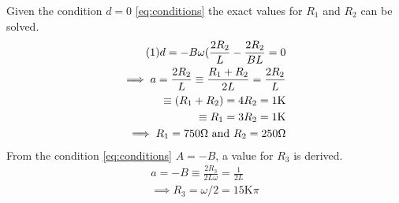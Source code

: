 \documentclass[conference]{IEEEtran}
\newcommand\numberthis{\addtocounter{equation}{1}\tag{\theequation}}
\begin{document}
Given the condition $d=0$ \eqref{eq:conditions} the exact values for $R_1$ and $R_2$ can be solved.
\begin{align*} \numberthis \label{eq:R1,R2}
    d = -B\omega(\frac{2R_2}{L}-\frac{2R_2}{BL} = 0 \\ 
    \implies a = \frac{2R_2}{L} \equiv \frac{R_1 + R_2}{2L} = \frac{2R_2}{L} \\
    \equiv (R_1 + R_2)  = 4R_2 = 1\text{K} \\
    \equiv R_1 = 3R_2 = 1\text{K} \\ 
    \implies R_1 = 750\Omega \text{ and } R_2 = 250\Omega
\end{align*}
From the condition \eqref{eq:conditions} $A = -B$, a value for $R_3$ is derived.
\begin{align*}
    a = -B \equiv \frac{2R_3}{2L\omega} = \frac{1}{2L} \\
    \implies R_3 = \omega/2 = 15\text{K}\pi
\end{align*}
\end{document}
